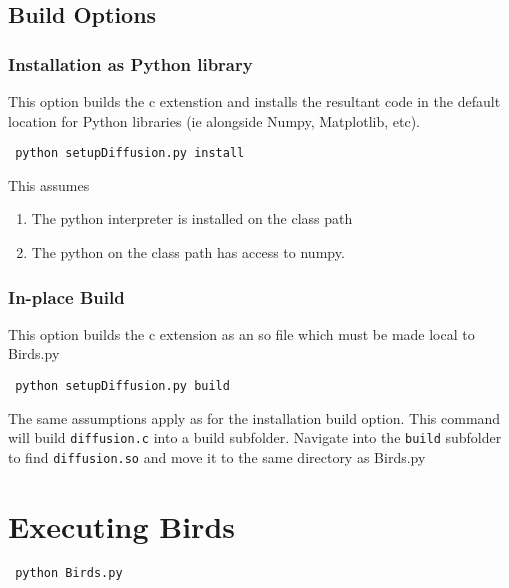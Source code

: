 \documentclass[a4paper,10pt]{article}
\begin{document}
\subsection{Build Options}
 \subsubsection{Installation as Python library} This option builds the c extenstion and installs the resultant code in the default location for Python libraries (ie alongside Numpy, Matplotlib, etc). \begin{verbatim} python setupDiffusion.py install\end{verbatim} This assumes \begin{enumerate} \item The python interpreter is installed on the class path \item The python on the class path has access to numpy.
                                                                                                                                                                                                                                                                             \end{enumerate}
  \subsubsection{In-place Build} This option builds the c extension as an so file which must be made local to Birds.py
 \begin{verbatim} python setupDiffusion.py build \end{verbatim}  The same assumptions apply as for the installation build option. This command will build \verb+diffusion.c+ into a build subfolder.  Navigate into the \verb+build+ subfolder to find \verb+diffusion.so+ and move it to the same directory as Birds.py



\section{Executing Birds}
\begin{verbatim} python Birds.py \end{verbatim}
\end{document}
